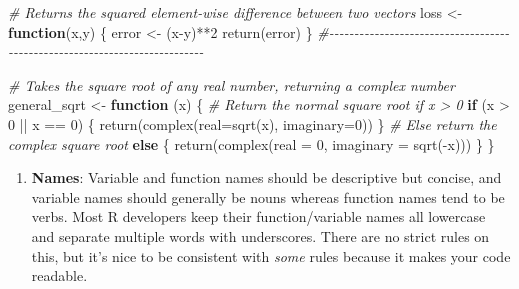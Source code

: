 \documentclass[
]{book}
\newenvironment{Shaded}{\begin{snugshade}}{\end{snugshade}}
\newcommand{\AttributeTok}[1]{\textcolor[rgb]{0.77,0.63,0.00}{#1}}
\newcommand{\CommentTok}[1]{\textcolor[rgb]{0.56,0.35,0.01}{\textit{#1}}}
\newcommand{\ControlFlowTok}[1]{\textcolor[rgb]{0.13,0.29,0.53}{\textbf{#1}}}
\newcommand{\DecValTok}[1]{\textcolor[rgb]{0.00,0.00,0.81}{#1}}
\newcommand{\FunctionTok}[1]{\textcolor[rgb]{0.00,0.00,0.00}{#1}}
\newcommand{\NormalTok}[1]{#1}
\newcommand{\OtherTok}[1]{\textcolor[rgb]{0.56,0.35,0.01}{#1}}
\newcommand{\SpecialCharTok}[1]{\textcolor[rgb]{0.00,0.00,0.00}{#1}}
\providecommand{\tightlist}{%
  \setlength{\itemsep}{0pt}\setlength{\parskip}{0pt}}
\begin{document}
\begin{Shaded}
\begin{Highlighting}[]
\CommentTok{\# Returns the squared element{-}wise difference between two vectors}
\NormalTok{loss }\OtherTok{\textless{}{-}} \ControlFlowTok{function}\NormalTok{(x,y) \{}
\NormalTok{  error }\OtherTok{\textless{}{-}}\NormalTok{ (x}\SpecialCharTok{{-}}\NormalTok{y)}\SpecialCharTok{**}\DecValTok{2}
  \FunctionTok{return}\NormalTok{(error)}
\NormalTok{\}}
\CommentTok{\#{-}{-}{-}{-}{-}{-}{-}{-}{-}{-}{-}{-}{-}{-}{-}{-}{-}{-}{-}{-}{-}{-}{-}{-}{-}{-}{-}{-}{-}{-}{-}{-}{-}{-}{-}{-}{-}{-}{-}{-}{-}{-}{-}{-}{-}{-}{-}{-}{-}{-}{-}{-}{-}{-}{-}{-}{-}{-}{-}{-}{-}{-}{-}{-}{-}{-}{-}{-}{-}{-}{-}{-}{-}{-}{-}}

\CommentTok{\# Takes the square root of any real number, returning a complex number}
\NormalTok{general\_sqrt }\OtherTok{\textless{}{-}} \ControlFlowTok{function}\NormalTok{ (x) \{}
  \CommentTok{\# Return the normal square root if x \textgreater{} 0}
  \ControlFlowTok{if}\NormalTok{ (x }\SpecialCharTok{\textgreater{}} \DecValTok{0} \SpecialCharTok{||}\NormalTok{ x }\SpecialCharTok{==} \DecValTok{0}\NormalTok{) \{}
    \FunctionTok{return}\NormalTok{(}\FunctionTok{complex}\NormalTok{(}\AttributeTok{real=}\FunctionTok{sqrt}\NormalTok{(x), }\AttributeTok{imaginary=}\DecValTok{0}\NormalTok{))}
\NormalTok{  \}}
  \CommentTok{\# Else return the complex square root}
  \ControlFlowTok{else}\NormalTok{ \{}
    \FunctionTok{return}\NormalTok{(}\FunctionTok{complex}\NormalTok{(}\AttributeTok{real =} \DecValTok{0}\NormalTok{, }\AttributeTok{imaginary =} \FunctionTok{sqrt}\NormalTok{(}\SpecialCharTok{{-}}\NormalTok{x)))}
\NormalTok{  \}}
\NormalTok{\}}
\end{Highlighting}
\end{Shaded}

\begin{enumerate}
\def\labelenumi{\arabic{enumi}.}
\setcounter{enumi}{1}
\tightlist
\item
  \textbf{Names}: Variable and function names should be descriptive but concise, and variable names should generally be nouns whereas function names tend to be verbs. Most R developers keep their function/variable names all lowercase and separate multiple words with underscores. There are no strict rules on this, but it's nice to be consistent with \emph{some} rules because it makes your code readable.
\end{enumerate}
\end{document}
